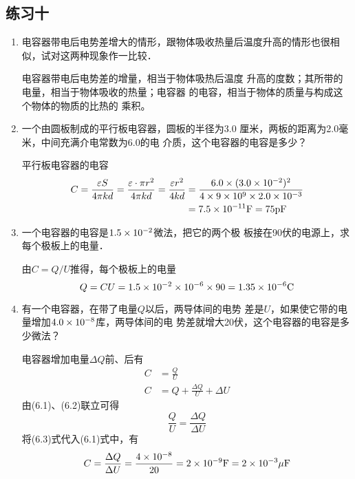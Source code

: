 \subsection{练习十}
\begin{enumerate}
	\item 电容器带电后电势差增大的情形，跟物体吸收热量后温度升高的情形也很相似，试对这两种现象作一比较．

    \begin{solution}
        电容器带电后电势差的增量，相当于物体吸热后温度
        升高的度数；其所带的电量，相当于物体吸收的热量；电容器
        的电容，相当于物体的质量与构成这个物体的物质的比热的
        乘积。
    \end{solution}
    
	\item 一个由圆板制成的平行板电容器，圆板的半径为3.0
厘米，两板的距离为2.0毫米，中间充满介电常数为6.0的电
介质，这个电容器的电容是多少？

\begin{solution}
    平行板电容器的电容
\[\begin{split}
    C=\dfrac{\varepsilon S}{4\pi kd}=\dfrac{\varepsilon\cdot  \pi r^2}{4\pi kd}=\frac{\varepsilon r^2}{4kd}
    &=\frac{6.0\times (3.0\times 10^{-2})^2}{4\times 9\times 10^9\times 2.0\times 10^{-3}}\\
    &=7.5\times 10^{-11}{\rm F}=75{\rm pF}
\end{split}\]
\end{solution}

\item 一个电容器的电容是$1.5\times10^{-2}$微法，把它的两个极
板接在90伏的电源上，求每个极板上的电量．

\begin{solution}
    由$C=Q/U$推得，每个极板上的电量
   \[ Q=CU=1.5\times10^{-2}\times10^{-6}\times90=1.35\times10^{-6}{\rm C}\]
\end{solution}

\item 有一个电容器，在带了电量$Q$以后，两导体间的电势
差是$U$，如果使它带的电量增加$4.0\times10^{-8}$库，两导体间的电
势差就增大20伏，这个电容器的电容是多少微法？

\begin{solution}
    电容器增加电量$\Delta Q$前、后有
    \begin{align}
    C&=\frac{Q}{U}\\
    C&=Q+\frac{\Delta Q}{U}+\Delta U    
    \end{align}
    由(6.1)、(6.2)联立可得
\begin{equation}
    \frac{Q}{U}=\frac{\Delta Q}{\Delta U}
\end{equation}
    将(6.3)式代入(6.1)式中，有
\[C=\frac{\Delta Q}{\Delta U}=\frac{4\times10^{-8}}{20}=2\times10^{-9}{\rm F}=2\times10^{-3}{\rm \mu F}\]



\end{solution}
\end{enumerate}
